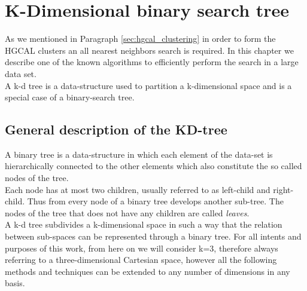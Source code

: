 \chapter{K-Dimensional binary search tree}\label{ch:volume_kd}
As we mentioned in Paragraph \ref{sec:hgcal_clustering} in order to form the HGCAL clusters an all nearest neighbors search is required. In this chapter we describe one of the known algorithms to efficiently perform the search in a large data set.\\
A k-d tree is a data-structure used to partition a k-dimensional space and is a special case of a binary-search tree.

\section{General description of the KD-tree}
A binary tree is a data-structure in which each element of the data-set is hierarchically connected to the other elements which also constitute the so called nodes of the tree.\\
Each node has at most two children, usually referred to as left-child and right-child. Thus from every node of a binary tree develops another sub-tree. The nodes of the tree that does not have any children are called \textit{leaves}.\\
A k-d tree subdivides a k-dimensional space in such a way that the relation between sub-spaces can be represented through a binary tree.
For all intents and purposes of this work, from here on we will consider k=3, therefore always referring to a three-dimensional Cartesian space, however all the following methods and techniques can be extended to any number of dimensions in any basis.
  

